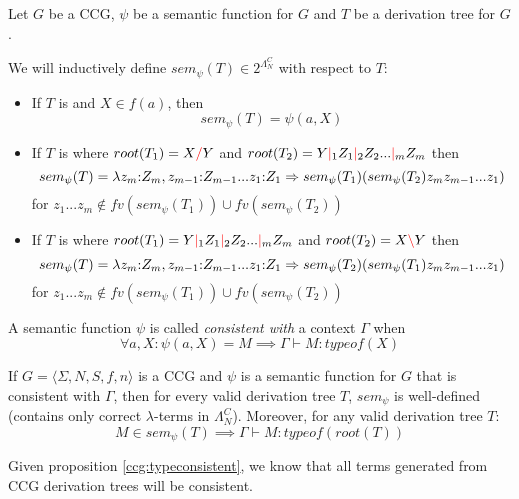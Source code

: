 \documentclass[main.tex]{subfiles}
\begin{document}
\begin{defn}
    Let $G$ be a CCG, $\psi$ be a semantic function for $G$ and $T$ be a
    derivation tree for $G$.

    We will inductively define $sem_{\psi}(T) \in 2^{\Lambda_N^C}$ with
    respect to $T$:
    \begin{itemize}
        \item If $T$ is
            and $X \in f(a)$, then
            \[ sem_{\psi}(T) = \psi(a, X) \]
        \item If $T$ is
            where $root(T_1) = X \textcolor{red}{/} Y$ and $root(T_2) = Y \textcolor{red}{|}_1 Z_1 \textcolor{red}{|}_2 Z_2 ... \textcolor{red}{|}_m Z_m$ then
            \[ sem_{\psi}(T) = \lambda z_m {:} Z_m, z_{m - 1} {:} Z_{m - 1} ... z_1 {:} Z_1 \Rightarrow
                sem_{\psi}(T_1) ( sem_{\psi}(T_2) z_m z_{m - 1} ... z_1 ) \]
            for $z_1 ... z_m \not\in fv(sem_{\psi}(T_1)) \cup fv(sem_{\psi}(T_2))$
        \item If $T$ is
            where $root(T_1) = Y \textcolor{red}{|}_1 Z_1 \textcolor{red}{|}_2 Z_2 ... \textcolor{red}{|}_m Z_m$ and $root(T_2) = X \textcolor{red}{\backslash} Y$ then
            \[ sem_{\psi}(T) = \lambda z_m {:} Z_m, z_{m - 1} {:} Z_{m - 1} ... z_1 {:} Z_1 \Rightarrow
                sem_{\psi}(T_2) ( sem_{\psi}(T_1) z_m z_{m - 1} ... z_1 ) \]
            for $z_1 ... z_m \not\in fv(sem_{\psi}(T_1)) \cup fv(sem_{\psi}(T_2))$
    \end{itemize}
\end{defn}

\begin{defn}
    A semantic function $\psi$ is called \emph{consistent with} a context
    $\Gamma$ when
    \[
        \forall a, X: \psi(a, X) = M \implies \Gamma \vdash M : typeof(X)
    \]
\end{defn}

\begin{prop}
    \label{ccg:typeconsistent}
    If $ G = \langle \Sigma, N, S, f, n \rangle $ is a CCG and $\psi$ is a
    semantic function for $G$ that is consistent with $\Gamma$, then
    for every valid derivation tree $T$, $sem_{\psi}$ is well-defined (contains
    only correct $\lambda$-terms in $\Lambda_N^C$). Moreover, for any valid
    derivation tree $T$:
    \[
        M \in sem_{\psi}(T) \implies \Gamma \vdash M : typeof(root(T))
    \]
\end{prop}

Given proposition \autoref{ccg:typeconsistent}, we know that all terms generated
from CCG derivation trees will be consistent.
\end{document}
